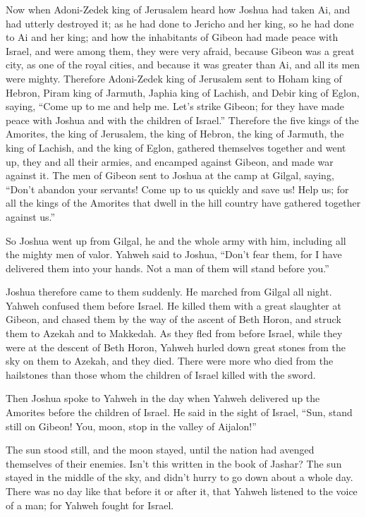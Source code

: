  Now when Adoni-Zedek king of Jerusalem heard how Joshua
had taken Ai, and had utterly destroyed it; as he had done to Jericho
and her king, so he had done to Ai and her king; and how the inhabitants
of Gibeon had made peace with Israel, and were among them,
 they were very afraid, because Gibeon was a great city,
as one of the royal cities, and because it was greater than Ai, and all
its men were mighty.  Therefore Adoni-Zedek king of
Jerusalem sent to Hoham king of Hebron, Piram king of Jarmuth, Japhia
king of Lachish, and Debir king of Eglon, saying,  ``Come
up to me and help me. Let's strike Gibeon; for they have made peace with
Joshua and with the children of Israel.''  Therefore the
five kings of the Amorites, the king of Jerusalem, the king of Hebron,
the king of Jarmuth, the king of Lachish, and the king of Eglon,
gathered themselves together and went up, they and all their armies, and
encamped against Gibeon, and made war against it.  The men
of Gibeon sent to Joshua at the camp at Gilgal, saying, ``Don't abandon
your servants! Come up to us quickly and save us! Help us; for all the
kings of the Amorites that dwell in the hill country have gathered
together against us.''

 So Joshua went up from Gilgal, he and the whole army with
him, including all the mighty men of valor.  Yahweh said
to Joshua, ``Don't fear them, for I have delivered them into your hands.
Not a man of them will stand before you.''

 Joshua therefore came to them suddenly. He marched from
Gilgal all night.  Yahweh confused them before Israel. He
killed them with a great slaughter at Gibeon, and chased them by the way
of the ascent of Beth Horon, and struck them to Azekah and to Makkedah.
 As they fled from before Israel, while they were at the
descent of Beth Horon, Yahweh hurled down great stones from the sky on
them to Azekah, and they died. There were more who died from the
hailstones than those whom the children of Israel killed with the sword.

 Then Joshua spoke to Yahweh in the day when Yahweh
delivered up the Amorites before the children of Israel. He said in the
sight of Israel, ``Sun, stand still on Gibeon! You, moon, stop in the
valley of Aijalon!''

 The sun stood still, and the moon stayed, until the
nation had avenged themselves of their enemies. Isn't this written in
the book of Jashar? The sun stayed in the middle of the sky, and didn't
hurry to go down about a whole day.  There was no day
like that before it or after it, that Yahweh listened to the voice of a
man; for Yahweh fought for Israel.

